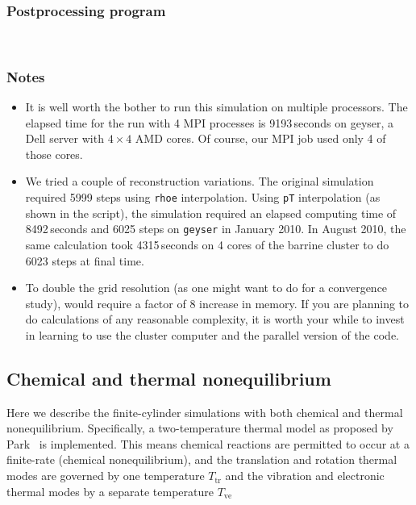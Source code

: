 \subsubsection{Postprocessing program}
\label{finite-cyl-post-files}
\topbar

\bottombar\\
\topbar

\bottombar

\subsubsection{Notes}
\begin{itemize}
\item It is well worth the bother to run this simulation on multiple processors. 
  The elapsed time for the run with 4 MPI processes is 9193\,seconds on geyser,
  a Dell server with $4\times4$ AMD cores.
  Of course, our MPI job used only 4 of those cores.
\item We tried a couple of reconstruction variations.  
  The original simulation required 5999 steps using \texttt{rhoe} interpolation.
  Using \texttt{pT} interpolation (as shown in the script), the simulation required 
  an elapsed computing time of 8492\,seconds and 6025 steps on \texttt{geyser} in January 2010.
  In August 2010, the same calculation took 4315\,seconds on 4 cores of the barrine cluster 
  to do 6023 steps at final time.
\item To double the grid resolution (as one might want to do for a convergence
  study), would require a factor of 8 increase in memory.
  If you are planning to do calculations of any reasonable complexity, it is
  worth your while to invest in learning to use the cluster computer and
  the parallel version of the code.
\end{itemize}

\subsection{Chemical and thermal nonequilibrium}
\label{finite-cyl-therm-noneq}

\medskip
Here we describe the finite-cylinder simulations with both chemical and thermal nonequilibrium.
Specifically, a two-temperature thermal model as proposed by Park~\cite{park_1989} is implemented.
This means chemical reactions are permitted to occur at a finite-rate (chemical nonequilibrium), and the translation and rotation thermal modes are governed by one temperature $T_\text{tr}$ and the vibration and electronic thermal modes by a separate temperature $T_\text{ve}$ 


